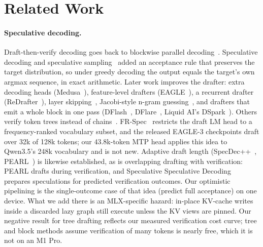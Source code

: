 \section{Related Work}
\label{sec:related}

\paragraph{Speculative decoding.}
Draft-then-verify decoding goes back to blockwise parallel decoding~\cite{stern2018blockwise}.
Speculative decoding and speculative sampling~\cite{leviathan2023fast,chen2023accelerating} added an acceptance rule that preserves the target distribution, so under greedy decoding the output equals the target's own argmax sequence, in exact arithmetic.
Later work improves the drafter: extra decoding heads (Medusa~\cite{cai2024medusa}), feature-level drafters (EAGLE~\cite{li2024eagle,li2024eagle2,li2025eagle3}), a recurrent drafter (ReDrafter~\cite{cheng2024redrafter}), layer skipping~\cite{zhang2024draftverify}, Jacobi-style n-gram guessing~\cite{fu2024lookahead}, and drafters that emit a whole block in one pass (DFlash~\cite{chen2026dflash}, DFlare~\cite{zhang2026dflare}, Liquid AI's DSpark~\cite{liquid2026dspark}).
Others verify token trees instead of chains~\cite{miao2024specinfer,li2024eagle2,xiong2024dyspec}.
FR-Spec~\cite{zhao2025frspec} restricts the draft LM head to a frequency-ranked vocabulary subset, and the released EAGLE-3 checkpoints draft over 32k of 128k tokens; our 43.8k-token MTP head applies this idea to Qwen3.5's 248k vocabulary and is not new.
Adaptive draft length (SpecDec++~\cite{huang2025specdecpp}, PEARL~\cite{liu2025pearl}) is likewise established, as is overlapping drafting with verification: PEARL drafts during verification, and Speculative Speculative Decoding~\cite{kumar2026ssd} prepares speculations for predicted verification outcomes.
Our optimistic pipelining is the single-outcome case of that idea (predict full acceptance) on one device.
What we add there is an MLX-specific hazard: in-place KV-cache writes inside a discarded lazy graph still execute unless the KV views are pinned.
Our negative result for tree drafting reflects our measured verification cost curve; tree and block methods assume verification of many tokens is nearly free, which it is not on an M1 Pro.

